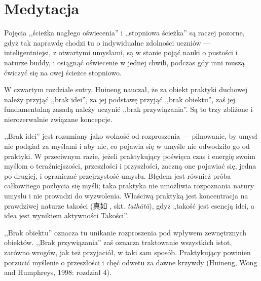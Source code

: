 \section{Medytacja}

Pojęcia ,,ścieżka nagłego oświecenia'' i ,,stopniowa ścieżka'' są raczej pozorne, gdyż tak naprawdę chodzi tu o indywidualne zdolności uczniów --- inteligentniejsi, z otwartymi umysłami, są w stanie pojąć nauki o pustości i naturze buddy, i osiągnąć oświecenie w jednej chwili, podczas gdy inni muszą ćwiczyć się na owej ścieżce stopniowo.


W czwartym rozdziale sutry, Huineng nauczał, że za obiekt praktyki duchowej należy przyjąć ,,brak idei'', za jej podstawę przyjąć ,,brak obiektu'', zaś jej fundamentalną zasadą należy uczynić ,,brak przywiązania''. Są to trzy zbliżone i nierozerwalnie związane koncepcje.

,,Brak idei'' jest rozumiany jako wolność od rozproszenia --- pilnowanie, by umysł nie podążał za myślami i aby nic, co pojawia się w umyśle nie odwodziło go od praktyki. W przeciwnym razie, jeżeli praktykujący poświęca czas i energię swoim myślom o teraźniejszości, przeszłości i przyszłości, zaczną one pojawiać się, jedna po drugiej, i ograniczać przejrzystość umysłu. Błędem jest również próba całkowitego pozbycia się myśli; taka praktyka nie umożliwia rozpoznania natury umysłu i nie prowadzi do wyzwolenia. Właściwą praktyką jest koncentracja na prawdziwej naturze takości (真如 , skt. \emph{tathātā}), gdyż „takość jest esencją idei, a idea jest wynikiem aktywności Takości”.

,,Brak obiektu'' oznacza tu unikanie rozproszenia pod wpływem zewnętrznych obiektów. ,,Brak przywiązania'' zaś oznacza traktowanie wszystkich istot, zarówno wrogów, jak też przyjaciół, w taki sam sposób. Praktykujący powinien porzucić myślenie o przeszłości i chęć odwetu za dawne krzywdy (Huineng, Wong and Humphreys, 1998: rozdział 4).

